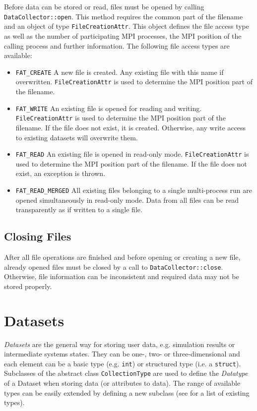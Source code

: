 \documentclass[a4paper,10pt,BCOR12mm]{report}
\newcommand{\code}[1]{\small \texttt{#1}}
\begin{document}
Before data can be stored or read, files must be opened by calling
\code{DataCollector::open}. This method requires the common part of the filename
and an object of type \code{FileCreationAttr}.
This object defines the file access type as well as the number of
participating MPI processes, the MPI position of the calling process and further information.
The following file access types are available:
\begin{itemize}
	\item \code{FAT\_CREATE}
	A new file is created. Any existing file with this name if overwritten.
	\code{FileCreationAttr} is used to determine the MPI position part of the filename.

	\item \code{FAT\_WRITE}
	An existing file is opened for reading and writing.
	\code{FileCreationAttr} is used to determine the MPI position part of the filename.
	If the file does not exist, it is created.
	Otherwise, any write access to existing datasets will overwrite them.

	\item \code{FAT\_READ}
	An existing file is opened in read-only mode.
	\code{FileCreationAttr} is used to determine the MPI position part of the filename.
	If the file does not exist, an exception is thrown.

	\item \code{FAT\_READ\_MERGED}
	All existing files belonging to a single multi-process run are opened simultaneously in read-only mode.
	Data from all files can be read transparently as if written to a single file.
\end{itemize}

\subsection{Closing Files}

After all file operations are finished and before opening or creating a new file,
already opened files must be closed by a call to \code{DataCollector::close}.
Otherwise, file information can be inconsistent and required data may not
be stored properly.


\section{Datasets}

\emph{Datasets} are the general way for storing user data, e.g. simulation results or intermediate
systems states. They can be one-, two- or three-dimensional and each element can be
a basic type (e.g. \code{int}) or structured type (i.e. a \code{struct}).
Subclasses of the abstract class \code{CollectionType} are used to define the
\emph{Datatype} of a Dataset when storing data (or attributes to data).
The range of available types can be easily extended by defining a new subclass
(see  for a list of existing types).
\end{document}
